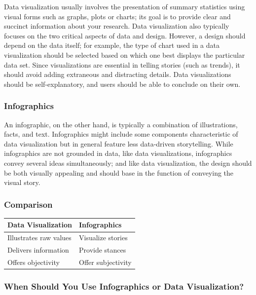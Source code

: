 \documentclass[]{book}
\begin{document}
Data visualization usually involves the presentation of summary statistics using visual forms such as graphs, plots or charts; its goal is to provide clear and succinct information about your research. Data visualization also typically focuses on the two critical aspects of data and design. However, a design should depend on the data itself; for example, the type of chart used in a data visualization should be selected based on which one best displays the particular data set. Since visualizations are essential in telling stories (such as trends), it should avoid adding extraneous and distracting details. Data visualizations should be self-explanatory, and users should be able to conclude on their own.

\hypertarget{infographics}{%
\subsubsection{Infographics}\label{infographics}}

An infographic, on the other hand, is typically a combination of illustrations, facts, and text. Infographics might include some components characteristic of data visualization but in general feature less data-driven storytelling. While infographics are not grounded in data, like data visualizations, infographics convey several ideas simultaneously; and like data visualization, the design should be both visually appealing and should base in the function of conveying the visual story.

\hypertarget{comparison}{%
\subsubsection{Comparison}\label{comparison}}

\begin{longtable}[]{@{}ll@{}}
\toprule
Data Visualization & Infographics\tabularnewline
\midrule
\endhead
Illustrates raw values & Visualize stories\tabularnewline
Delivers information & Provide stances\tabularnewline
Offers objectivity & Offer subjectivity\tabularnewline
\bottomrule
\end{longtable}

\hypertarget{when-should-you-use-infographics-or-data-visualization}{%
\subsubsection{When Should You Use Infographics or Data Visualization?}\label{when-should-you-use-infographics-or-data-visualization}}
\end{document}
